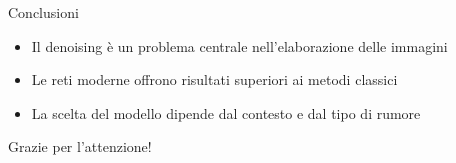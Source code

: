 \documentclass{beamer}
\begin{document}
\begin{frame}{Conclusioni}
    \begin{itemize}
        \item Il denoising è un problema centrale nell'elaborazione delle immagini
        \item Le reti moderne offrono risultati superiori ai metodi classici
        \item La scelta del modello dipende dal contesto e dal tipo di rumore
    \end{itemize}
\end{frame}

\begin{frame}
    \centering
    \Huge{Grazie per l'attenzione!}
\end{frame}
\end{document}
